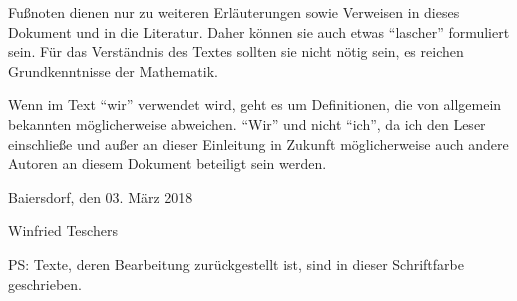 Fußnoten dienen nur zu weiteren Erläuterungen sowie Verweisen in dieses Dokument und in die Literatur.
Daher können sie auch etwas "`lascher"' formuliert sein.
Für das Verständnis des Textes sollten sie nicht nötig sein, es reichen Grundkenntnisse der Mathematik.

Wenn im Text "`wir"' verwendet wird, geht es um Definitionen, die von allgemein bekannten möglicherweise abweichen.
"`Wir"' und nicht "`ich"', da ich den Leser einschließe und außer an dieser Einleitung in Zukunft möglicherweise auch andere Autoren an diesem Dokument beteiligt sein werden.

\bigskip

Baiersdorf, den 03. März 2018

Winfried Teschers

\iftestFlg
	\bigskip
	\color{gray}%
	PS: Texte, deren Bearbeitung zurückgestellt ist, sind in dieser Schriftfarbe geschrieben.
	\color{black}%
\else \fi
